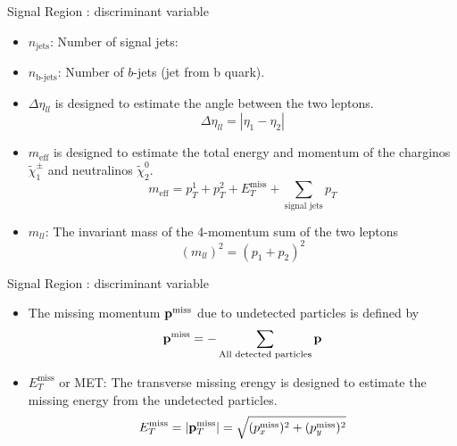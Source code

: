 \documentclass[mathserif,serif]{beamer}
\begin{document}
\begin{frame}{Signal Region : discriminant variable}
\begin{itemize}
\item $n_{\text{jets}}$: Number of signal jets:
\item $n_{\text{b-jets}}$: Number of $b$-jets (jet from b quark).
\item $\Delta \eta_{ll}$ is designed to estimate the angle between the two leptons.
\begin{equation*}
\Delta \eta_{ll} = |\eta_{1} - \eta_{2}|
\end{equation*}
\item $m_{\text{eff}}$ is designed to estimate the total energy and momentum of the charginos $\tilde{\chi}_1^\pm$ and neutralinos $\tilde{\chi}_2^0$.
\begin{equation*}
m_{\text{eff}} = p_T^1 + p_T^2 + E_T^{\text{miss}} + \sum_{\text {signal jets}} p_T
\end{equation*}
\item $m_{ll}$: The invariant mass of the 4-momentum sum of the two leptons
\begin{equation*}
(m_{ll})^2 = (p_1 + p_2)^2
\end{equation*}
\end{itemize}
\end{frame}

\begin{frame}{Signal Region : discriminant variable}
\begin{itemize}
\item The missing momentum ${\bf p}^{\text{miss}}$ due to undetected particles is defined by
\begin{equation*}
{\bf p}^{\text{miss}} = - \sum_{\text{All detected particles}}{\bf p}
\end{equation*}
\item $E_{T}^{\text{miss}}$ or MET: The transverse missing erengy is designed to estimate the missing energy from the undetected particles.
\begin{equation*}
E_{T}^{\text{miss}} = |{\bf p}_T^{\text{miss}}| = \sqrt{ (p_x^{\text{miss}})^2 + (p_y^{\text{miss}})^2}
\end{equation*}
\end{itemize}
\end{frame}
\end{document}
